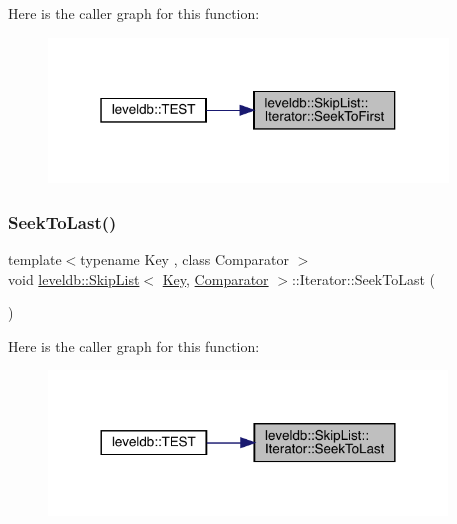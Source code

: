 Here is the caller graph for this function\+:
\nopagebreak
\begin{figure}[H]
\begin{center}
\leavevmode
\includegraphics[width=301pt]{classleveldb_1_1_skip_list_1_1_iterator_adf69c04f0480a66f10a125c49e19caa7_icgraph}
\end{center}
\end{figure}
\mbox{\label{classleveldb_1_1_skip_list_1_1_iterator_afe892ff436137b85216c2ed124f3c6dd}} 
\subsubsection{\texorpdfstring{SeekToLast()}{SeekToLast()}}
{\footnotesize\ttfamily template$<$typename Key , class Comparator $>$ \\
void \mbox{\hyperlink{classleveldb_1_1_skip_list}{leveldb\+::\+Skip\+List}}$<$ \mbox{\hyperlink{namespaceleveldb_a7e9a9725b13fa0bd922d885280dfab95}{Key}}, \mbox{\hyperlink{structleveldb_1_1_comparator}{Comparator}} $>$\+::Iterator\+::\+Seek\+To\+Last (\begin{DoxyParamCaption}{ }\end{DoxyParamCaption})\hspace{0.3cm}{\ttfamily [inline]}}

Here is the caller graph for this function\+:
\nopagebreak
\begin{figure}[H]
\begin{center}
\leavevmode
\includegraphics[width=300pt]{classleveldb_1_1_skip_list_1_1_iterator_afe892ff436137b85216c2ed124f3c6dd_icgraph}
\end{center}
\end{figure}
\mbox{\label{classleveldb_1_1_skip_list_1_1_iterator_a6eaf87cf7b2a58908ea3d8f9cccc606f}} 
